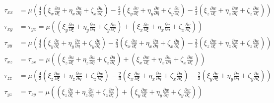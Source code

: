 \begin{align*}
\tau_{xx}&=
\mu \left(\frac{4}{3}\left(\xi_x\frac{\partial u}{\partial \xi}+\eta_x\frac{\partial u}{\partial \eta}+\zeta_x\frac{\partial u}{\partial \zeta}\right)-\frac{2}{3}\left(\xi_y\frac{\partial v}{\partial \xi}+\eta_y\frac{\partial v}{\partial \eta}+\zeta_y\frac{\partial v}{\partial \zeta}\right)-\frac{2}{3}\left(\xi_z\frac{\partial w}{\partial \xi}+\eta_z\frac{\partial w}{\partial \eta}+\zeta_z\frac{\partial w}{\partial \zeta}\right) \right)
\\
\tau_{xy}&=\tau_{yx}=
\mu \left(\left(\xi_y\frac{\partial u}{\partial \xi}+\eta_y\frac{\partial u}{\partial \eta}+\zeta_y\frac{\partial u}{\partial \zeta}\right)+\left(\xi_x\frac{\partial v}{\partial \xi}+\eta_x\frac{\partial v}{\partial \eta}+\zeta_x\frac{\partial v}{\partial \zeta}\right) \right)
\\
\tau_{yy}&=
\mu \left(\frac{4}{3}\left(\xi_y\frac{\partial v}{\partial \xi}+\eta_y\frac{\partial v}{\partial \eta}+\zeta_y\frac{\partial v}{\partial \zeta}\right)-\frac{2}{3}\left(\xi_x\frac{\partial u}{\partial \xi}+\eta_x\frac{\partial u}{\partial \eta}+\zeta_x\frac{\partial u}{\partial \zeta}\right)-\frac{2}{3}\left(\xi_z\frac{\partial w}{\partial \xi}+\eta_z\frac{\partial w}{\partial \eta}+\zeta_z\frac{\partial w}{\partial \zeta}\right) \right)
\\
\tau_{xz}&=\tau_{zx}=
\mu \left(\left(\xi_z\frac{\partial u}{\partial \xi}+\eta_z\frac{\partial u}{\partial \eta}+\zeta_z\frac{\partial u}{\partial \zeta}\right)+\left(\xi_x\frac{\partial w}{\partial \xi}+\eta_x\frac{\partial w}{\partial \eta}+\zeta_x\frac{\partial w}{\partial \zeta}\right) \right)
\\
\tau_{zz}&=
\mu \left(\frac{4}{3}\left(\xi_z\frac{\partial w}{\partial \xi}+\eta_z\frac{\partial w}{\partial \eta}+\zeta_z\frac{\partial w}{\partial \zeta}\right)-\frac{2}{3}\left(\xi_x\frac{\partial u}{\partial \xi}+\eta_x\frac{\partial u}{\partial \eta}+\zeta_x\frac{\partial u}{\partial \zeta}\right)-\frac{2}{3}\left(\xi_y\frac{\partial v}{\partial \xi}+\eta_y\frac{\partial v}{\partial \eta}+\zeta_y\frac{\partial v}{\partial \zeta}\right) \right)
\\
\tau_{yz}&=\tau_{zy}=
\mu \left(\left(\xi_z\frac{\partial v}{\partial \xi}+\eta_z\frac{\partial v}{\partial \eta}+\zeta_z\frac{\partial v}{\partial \zeta}\right)+\left(\xi_y\frac{\partial w}{\partial \xi}+\eta_y\frac{\partial w}{\partial \eta}+\zeta_y\frac{\partial w}{\partial \zeta}\right) \right)
\end{align*}

